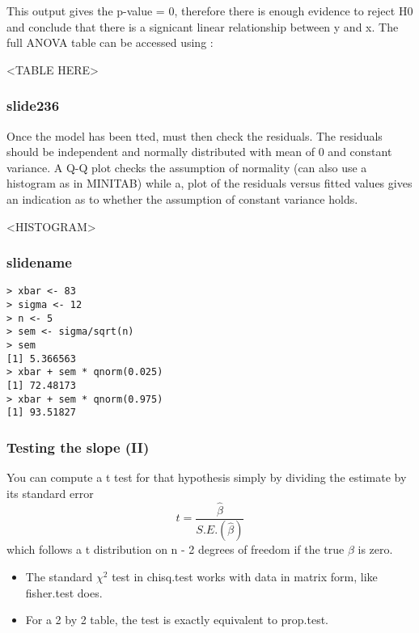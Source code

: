 \documentclass[a4paper,12pt]{article}
\begin{document}
\begin{itemize}
\begin{itemize}
This output gives the p-value = 0, therefore there is enough evidence to reject H0 and conclude that there is a signicant linear relationship between y and x. The full ANOVA table can be accessed using :

<TABLE HERE>



\subsubsection{slide236}
Once the model has been tted, must then check the residuals.
The residuals should be independent and normally distributed with
mean of 0 and constant variance.
A Q-Q plot checks the assumption of normality (can also use a
histogram as in MINITAB) while a, plot of the residuals versus fitted values gives an indication as to whether the assumption of constant variance holds.

<HISTOGRAM>


\subsubsection{slidename}

\footnotesize \begin{verbatim}
> xbar <- 83
> sigma <- 12
> n <- 5
> sem <- sigma/sqrt(n)
> sem
[1] 5.366563
> xbar + sem * qnorm(0.025)
[1] 72.48173
> xbar + sem * qnorm(0.975)
[1] 93.51827
 \end{verbatim}\normalsize


\subsubsection{Testing the slope (II)}

You can compute a
t test for that hypothesis simply by dividing the estimate by its standard
error
\begin{equation}
t = \frac{\hat{\beta}}{S.E.(\hat{\beta})}
\end{equation}
which follows a t distribution on n - 2 degrees of freedom if the true $\beta$ is
zero.


\begin{itemize}
\item The standard $\chi^{2}$ test  in chisq.test works with data in matrix form, like fisher.test does.
\item For a 2 by 2 table, the test is exactly equivalent to prop.test.
\end{itemize}



\end{itemize}
\end{itemize}
\end{document}
